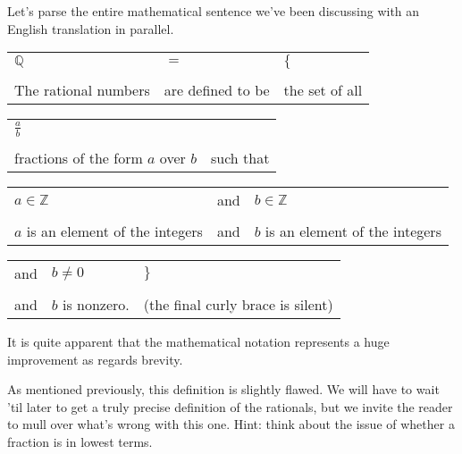 \documentclass[10pt,]{book}
\theoremstyle{plain}
\theoremstyle{definition}
\theoremstyle{definition}
\numberwithin{equation}{section}
\newcommand{\hrulethin}  {\noalign{\hrule height 0.04em}}
\newcommand{\suchthat}{\;  \;}
\newcommand{\Integers}{{\mathbb Z}}
\newcommand{\Rationals}{{\mathbb Q}}
\begin{document}
    Let's parse the entire mathematical sentence we've been discussing
    with an English translation in parallel.
\begin{tabular}{lll}
\(\Rationals\)&\(=\)&\(\{\)\tabularnewline[0pt]
&&\tabularnewline\hrulethin
The rational numbers&are defined to be&the set of all
\end{tabular}
\begin{tabular}{ll}
\(\displaystyle \frac{a}{b}\)&\(\suchthat\)\tabularnewline[0pt]
&\tabularnewline\hrulethin
fractions of the form \(a\) over \(b\)&such that
\end{tabular}
\begin{tabular}{lll}
\(a \in \Integers\)&and&\(b \in \Integers\)\tabularnewline[0pt]
&&\tabularnewline\hrulethin
\(a\) is an element of the integers&and&\(b\) is an
      element of the integers
\end{tabular}
\begin{tabular}{lll}
and&\(b \neq 0\)&\(\}\)\tabularnewline[0pt]
&&\tabularnewline\hrulethin
and&\(b\) is nonzero.&(the final curly brace
      is silent)
\end{tabular}
\par

    It is quite apparent that the mathematical notation represents a huge
    improvement as regards brevity.
\par

    As mentioned previously, this definition is slightly flawed. We will
    have to wait 'til later to get a truly precise
    definition of the rationals, but we invite the reader to mull over
    what's wrong with this one. Hint: think about the issue of whether
    a fraction is in lowest terms.
\par
\end{document}
